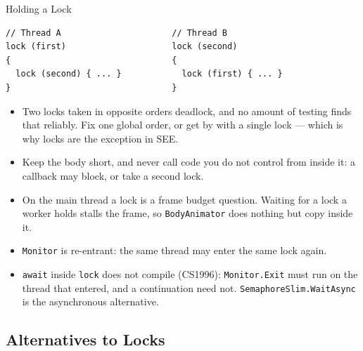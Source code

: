 \begin{frame}[fragile]{Holding a Lock}
  \begin{lstlisting}[basicstyle=\scriptsize\ttfamily]
// Thread A                      // Thread B
lock (first)                     lock (second)
{                                {
  lock (second) { ... }            lock (first) { ... }
}                                }
  \end{lstlisting}
  \vspace{1ex}

  \begin{itemize}
    \item Two locks taken in opposite orders deadlock, and no amount of
      testing finds that reliably. Fix one global order, or get by with a
      single lock --- which is why locks are the exception in SEE.
    \item Keep the body short, and never call code you do not control from
      inside it: a callback may block, or take a second lock.
    \item On the main thread a lock is a frame budget question. Waiting for a
      lock a worker holds stalls the frame, so \texttt{BodyAnimator} does
      nothing but copy inside it.
    \item \texttt{Monitor} is re-entrant: the same thread may enter the same
      lock again.
    \item \texttt{await} inside \texttt{lock} does not compile (CS1996):
      \texttt{Monitor.Exit} must run on the thread that entered, and a
      continuation need not. \texttt{SemaphoreSlim.WaitAsync} is the
      asynchronous alternative.
  \end{itemize}
\end{frame}

\subsection{Alternatives to Locks}

